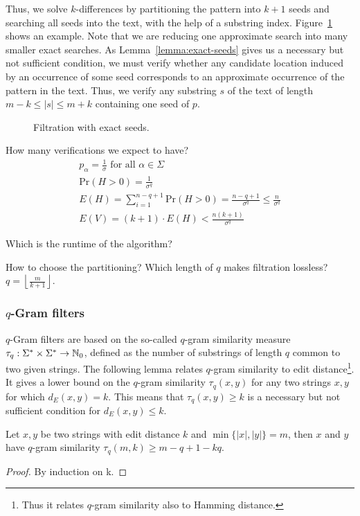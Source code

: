 Thus, we solve $k$-differences by partitioning the pattern into $k+1$ seeds and searching all seeds into the text, \eg with the help of a substring index.
Figure~\ref{fig:seeds-ext} shows an example.
Note that we are reducing one approximate search into many smaller exact searches.
As Lemma~\ref{lemma:exact-seeds} gives us a necessary but not sufficient condition, we must verify whether any candidate location induced by an occurrence of some seed corresponds to an approximate occurrence of the pattern in the text.
Thus, we verify any substring $s$ of the text of length $m - k \leq |s| \leq m + k$ containing one seed of $p$.

\begin{figure}[h]
\begin{center}
\caption{Filtration with exact seeds.}
\label{fig:seeds-ext}

\end{center}
\end{figure}

How many verifications we expect to have?
\begin{eqnarray}
p_\alpha = \frac{1}{\sigma} \text{ for all } \alpha \in \Sigma\\
\text{Pr}(H > 0) = \frac{1}{\sigma^q}\\
E(H) = \sum_{i=1}^{n-q+1}{\text{Pr}(H > 0)} = \frac{n - q + 1}{\sigma^q} \leq \frac{n}{\sigma^q}\\
E(V) = (k + 1) \cdot E(H) < \frac{n (k + 1)}{\sigma^q}
\end{eqnarray}

Which is the runtime of the algorithm?

How to choose the partitioning? Which length of $q$ makes filtration lossless?
$q=\left \lfloor \frac{m}{k+1} \right \rfloor$.


\subsubsection{$q$-Gram filters}

$q$-Gram filters are based on the so-called $q$-gram similarity measure $\tau_q : \Sigma^{*} \times \Sigma^{*} \rightarrow \mathbb {N}_0$, defined as the number of substrings of length $q$ common to two given strings.
The following lemma relates $q$-gram similarity to edit distance\footnote{Thus it relates $q$-gram similarity also to Hamming distance.}.
It gives a lower bound on the $q$-gram similarity $\tau_q(x,y)$ for any two strings $x,y$ for which $d_E(x,y) = k$.
This means that $\tau_q(x,y) \geq k$ is a necessary but not sufficient condition for $d_E(x,y) \leq k$.
\begin{lemma}
\label{lemma:qgrams}
\citep{?}
Let $x,y$ be two strings with edit distance $k$ and $\min\{|x|,|y|\} = m$, then $x$ and $y$ have $q$-gram similarity $\tau_q(m,k) \geq m - q + 1 - kq$.
\end{lemma}
\begin{proof}
By induction on k.
\end{proof}


